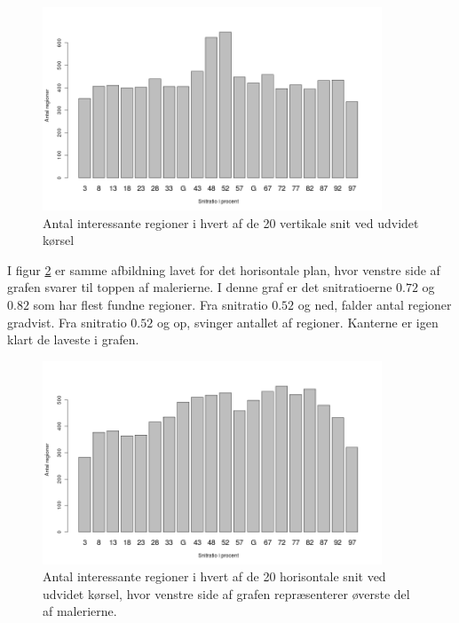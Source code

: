 {\begin{figure}[h!]
	\begin{center}
		\includegraphics[width=0.9\textwidth]{afsnit/resultater/billeder/cut0cut1eatsperratioU.png}
	\end{center}
	\caption{Antal interessante regioner i hvert af de 20 vertikale snit ved udvidet kørsel}
	\label{antal_regioner_vertikale_cut_udvidet}
\end{figure}

I figur \ref{antal_regioner_horisontale_cut_udvidet} er samme afbildning
lavet for det horisontale plan, hvor venstre side af grafen svarer til
toppen af malerierne. I denne graf er det snitratioerne $0.72$ og $0.82$
som har flest fundne regioner. Fra snitratio $0.52$ og ned, falder antal
regioner gradvist. Fra snitratio $0.52$ og op, svinger antallet af
regioner. Kanterne er igen klart de laveste i grafen.

\begin{figure}[h!]
	\begin{center}
		\includegraphics[width=0.9\textwidth]{afsnit/resultater/billeder/cut2cut3eatsperratioU.png}
	\end{center}
    \caption{Antal interessante regioner i hvert af de 20 horisontale
    snit ved udvidet kørsel, hvor venstre side af grafen repræsenterer
    øverste del af malerierne.}
    \label{antal_regioner_horisontale_cut_udvidet}
\end{figure}

}
